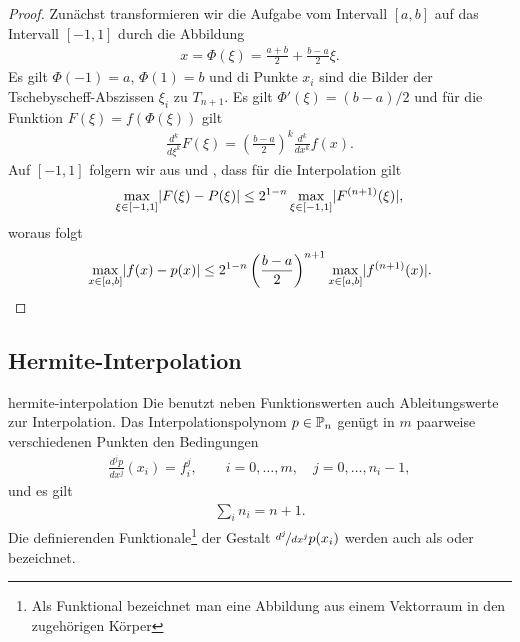 \begin{proof}
  Zunächst transformieren wir die Aufgabe vom Intervall $[a,b]$ auf
  das Intervall $[-1,1]$ durch die Abbildung
  \begin{gather}
    x = \Phi(\xi) = \frac{a+b}2 + \frac{b-a}2 \xi.
  \end{gather}
  Es gilt $\Phi(-1) = a$, $\Phi(1)=b$ und di Punkte $x_i$ sind die
  Bilder der Tschebyscheff-Abszissen $\xi_i$ zu $T_{n+1}$. Es gilt
  $\Phi'(\xi) = (b-a)/2$ und für die Funktion $F(\xi) = f(\Phi(\xi))$
  gilt
  \begin{gather}
    \frac{d^k}{d\xi^k} F(\xi) = \left(\frac{b-a}2\right)^k
    \frac{d^k}{dx^k} f(x).
  \end{gather}
  Auf $[-1,1]$ folgern wir aus  und
  , dass für die Interpolation gilt
  \begin{gather}
    \max_{\xi\in[-1,1]} \abs{F(\xi) - P(\xi)}
    \le 2^{1-n} \max_{\xi\in[-1,1]}\abs{F^{(n+1)}(\xi)},
  \end{gather}
  woraus folgt
  \begin{gather}
    \max_{x\in[a,b]} \abs{f(x) - p(x)}
    \le 2^{1-n} \left(\frac{b-a}2\right)^{n+1} \max_{x\in[a,b]}\abs{f^{(n+1)}(x)}.
  \end{gather}  
\end{proof}

\subsection{Hermite-Interpolation}

\begin{Definition}{hermite-interpolation}
  Die  benutzt neben Funktionswerten
  auch Ableitungswerte zur Interpolation. Das Interpolationspolynom
  $p\in \P_n$ genügt in $m$ paarweise verschiedenen Punkten den
  Bedingungen
  \begin{gather}
    \frac{d^j p}{dx^j}(x_i) = f_i^{j},
    \qquad i = 0,\dots, m, \quad j=0,\dots,n_i-1,
  \end{gather}
  und es gilt
  \begin{gather}
    \sum_{i} n_i = n+1.
  \end{gather}
  Die definierenden Funktionale\footnote{Als Funktional bezeichnet man
    eine Abbildung aus einem Vektorraum in den zugehörigen Körper} der Gestalt
  $\nicefrac{d^j}{dx^j} p(x_i)$ werden auch als 
  oder  bezeichnet.
\end{Definition}


